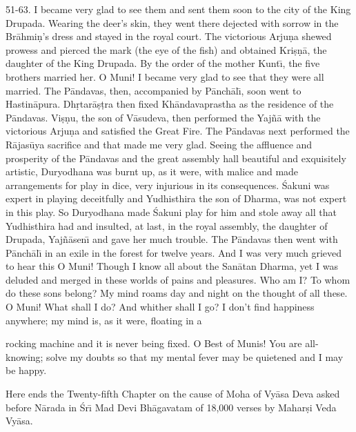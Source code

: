 51-63. I became very glad to see them and sent them soon to the city of the King Drupada. Wearing the deer's skin, they went there dejected with sorrow in the Br\=ahmi\d{n}'s dress and stayed in the royal court. The victorious Arju\d{n}a shewed prowess and pierced the mark (the eye of the fish) and obtained Kri\d{s}\d{n}\=a, the daughter of the King Drupada. By the order of the mother Kunt\={\i}, the five brothers married her. O Muni! I became very glad to see that they were all married. The P\=andavas, then, accompanied by P\=anch\=al\={\i}, soon went to Hastin\=apura. Dh\d{r}tar\=a\d{s}\d{t}ra then fixed Kh\=andavaprastha as the residence of the P\=andavas. Vi\d{s}\d{n}u, the son of V\=asudeva, then performed the Yaj\~n\=a with the victorious Arju\d{n}a and satisfied the Great Fire. The P\=andavas next performed the R\=ajas\=uya sacrifice and that made me very glad. Seeing the affluence and prosperity of the P\=andavas and the great assembly hall beautiful and exquisitely artistic, Duryodhana was burnt up, as it were, with malice and made arrangements for play in dice, very injurious in its consequences. \'Sakuni was expert in playing deceitfully and Yudhisthira the son of Dharma, was not expert in this play. So Duryodhana made \'Sakuni play for him and stole away all that Yudhisthira had and insulted, at last, in the royal assembly, the daughter of Drupada, Yaj\~n\=asen\={\i} and gave her much trouble. The P\=andavas then went with P\=anch\=al\={\i} in an exile in the forest for twelve years. And I was very much grieved to hear this O Muni! Though I know all about the San\=atan Dharma, yet I was deluded and merged in these worlds of pains and pleasures. Who am I? To whom do these sons belong? My mind roams day and night on the thought of all these. O Muni! What shall I do? And whither shall I go? I don't find happiness anywhere; my mind is, as it were, floating in a

rocking machine and it is never being fixed. O Best of Munis! You are all-knowing; solve my doubts so that my mental fever may be quietened and I may be happy.

Here ends the Twenty-fifth Chapter on the cause of Moha of Vy\=asa Deva asked before N\=arada in \'Sr\={\i} Mad Devi Bh\=agavatam of 18,000 verses by Mahar\d{s}i Veda Vy\=asa.



